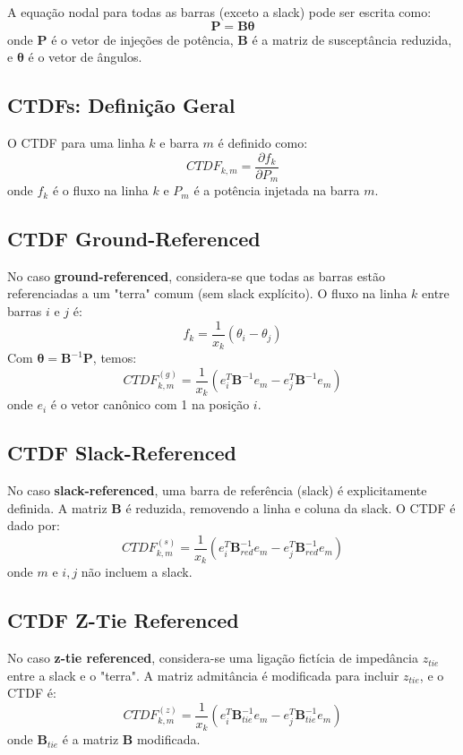 \documentclass[journal]{IEEEtran}
\begin{document}
A equação nodal para todas as barras (exceto a slack) pode ser escrita como:
\begin{equation}
    \mathbf{P} = \mathbf{B} \boldsymbol{\theta}
\end{equation}
onde $\mathbf{P}$ é o vetor de injeções de potência, $\mathbf{B}$ é a matriz de susceptância reduzida, e $\boldsymbol{\theta}$ é o vetor de ângulos.

\subsection{CTDFs: Definição Geral}
O CTDF para uma linha $k$ e barra $m$ é definido como:
\begin{equation}
    CTDF_{k,m} = \frac{\partial f_k}{\partial P_m}
\end{equation}
onde $f_k$ é o fluxo na linha $k$ e $P_m$ é a potência injetada na barra $m$.

\subsection{CTDF Ground-Referenced}
No caso \textbf{ground-referenced}, considera-se que todas as barras estão referenciadas a um "terra" comum (sem slack explícito). O fluxo na linha $k$ entre barras $i$ e $j$ é:
\begin{equation}
    f_k = \frac{1}{x_k} (\theta_i - \theta_j)
\end{equation}
Com $\boldsymbol{\theta} = \mathbf{B}^{-1} \mathbf{P}$, temos:
\begin{equation}
    CTDF^{(g)}_{k,m} = \frac{1}{x_k} \left( e_i^T \mathbf{B}^{-1} e_m - e_j^T \mathbf{B}^{-1} e_m \right)
\end{equation}
onde $e_i$ é o vetor canônico com 1 na posição $i$.

\subsection{CTDF Slack-Referenced}
No caso \textbf{slack-referenced}, uma barra de referência (slack) é explicitamente definida. A matriz $\mathbf{B}$ é reduzida, removendo a linha e coluna da slack. O CTDF é dado por:
\begin{equation}
    CTDF^{(s)}_{k,m} = \frac{1}{x_k} \left( e_i^T \mathbf{B}_{red}^{-1} e_m - e_j^T \mathbf{B}_{red}^{-1} e_m \right)
\end{equation}
onde $m$ e $i,j$ não incluem a slack.

\subsection{CTDF Z-Tie Referenced}
No caso \textbf{z-tie referenced}, considera-se uma ligação fictícia de impedância $z_{tie}$ entre a slack e o "terra". A matriz admitância é modificada para incluir $z_{tie}$, e o CTDF é:
\begin{equation}
    CTDF^{(z)}_{k,m} = \frac{1}{x_k} \left( e_i^T \mathbf{B}_{tie}^{-1} e_m - e_j^T \mathbf{B}_{tie}^{-1} e_m \right)
\end{equation}
onde $\mathbf{B}_{tie}$ é a matriz $\mathbf{B}$ modificada.
\end{document}
